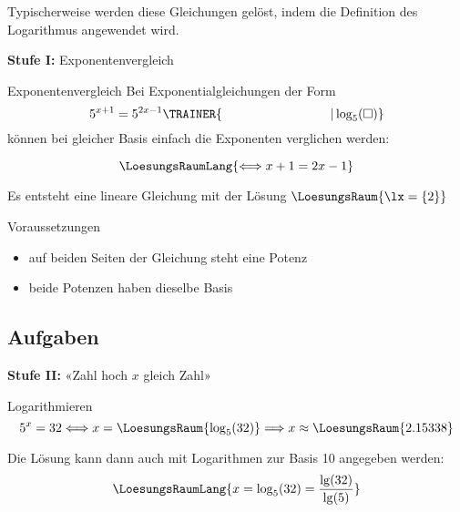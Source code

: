 Typischerweise werden diese Gleichungen gelöst, indem die Definition
des Logarithmus angewendet wird.


\vspace{4mm}
\textbf{Stufe I:} Exponentenvergleich\\

\begin{rezept}{Exponentenvergleich}{}
Bei Exponentialgleichungen der Form $$5^{x+1} =
5^{2x-1}\TRAINER{\hspace{30mm}| \log_5(\Box{})}$$ können bei
gleicher Basis einfach die Exponenten verglichen werden:

$$\LoesungsRaumLang{\Longleftrightarrow x+1=2x-1}$$


Es entsteht eine lineare Gleichung mit der Lösung $\LoesungsRaum{\lx = \{2\}}$
\end{rezept}

\begin{bemerkung}{Voraussetzungen}{}
  \begin{itemize}
  \item auf beiden Seiten der Gleichung steht eine Potenz
  \item beide Potenzen haben dieselbe Basis
    \end{itemize}
\end{bemerkung}
\newpage


\subsection*{Aufgaben}

\newpage
\textbf{Stufe II:} «Zahl hoch $x$ gleich Zahl»


\begin{rezept}{Logarithmieren}{}
$$5^x=32 \Longleftrightarrow x=\LoesungsRaum{\log_5(32)} \Longrightarrow x \approx \LoesungsRaum{2.15338}$$

Die Lösung kann dann auch mit Logarithmen zur Basis 10 angegeben
werden:
$$\LoesungsRaumLang{x = \log_5(32) = \frac{\lg(32)}{\lg(5)}}$$
\end{rezept}


